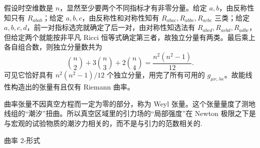 假设时空维数是 $n$，显然至少要两个不同指标才有非零分量。给定 $a,b$，由反称性知只有 $R_{abab}$；给定 $a,b,c$，由反称性和对称性知有 $R_{abac},R_{abbc},R_{acbc}$ 三类；给定 $a,b,c,d$，前一对指标选完就确定了后一对，由对称性知选法有 $R_{abcd},R_{acbd},R_{adbc}$，但给定两个就能按非平凡 Ricci 恒等式确定第三者，故独立分量有两类。最后乘上各自组合数，则独立分量数共为
\[
    \binom n2+3\binom n3+2\binom n4=\frac{n^2(n^2-1)}{12}.
\]
可见它恰好具有 ${n^2(n^2-1)}/{12}$ 个独立分量，用完了所有可用的 $g_{\mu\nu,\lambda\kappa}$。故能线性构造出的张量有且仅有 Riemann 曲率。

曲率张量不因真空方程而一定为零的部分，称为 Weyl 张量。这个张量量度了测地线组的“潮汐”扭曲。所以真空区域里的引力场的“局部强度”在 Newton 极限之下是与宏观的试验物质的潮汐力相关的，而不是与引力的范数相关的.

曲率 2-形式

